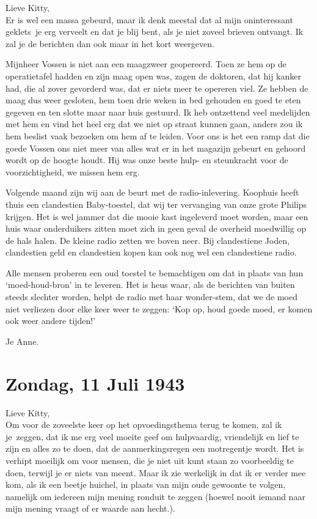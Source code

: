 \documentclass{book}
\begin{document}
Lieve Kitty,\\Er is wel een massa gebeurd, maar ik denk meestal dat al
mijn oninteressant geklets~je erg verveelt en dat je blij bent, als je
niet zoveel brieven ontvangt. Ik zal je de berichten dan ook maar in het
kort weergeven.

Mijnheer Vossen is niet aan een maagzweer geopereerd. Toen ze hem op de
operatietafel hadden en zijn maag open was, zagen de doktoren, dat hij
kanker had, die al zover gevorderd was, dat er niets meer te opereren
viel. Ze hebben de maag dus weer gesloten, hem toen drie weken in bed
gehouden en goed te eten gegeven en ten slotte maar naar huis gestuurd.
Ik heb ontzettend veel medelijden met hem en vind het heel erg dat we
niet op straat kunnen gaan, anders zou ik hem beslist vaak bezoeken om
hem af te leiden. Voor ons is het een ramp dat die goede Vossen ons niet
meer van alles wat er in het magazijn gebeurt en gehoord wordt op de
hoogte houdt. Hij was onze beste hulp- en steunkracht voor de
voorzichtigheid, we missen hem erg.

Volgende maand zijn wij aan de beurt met de radio-inlevering. Koophuis
heeft thuis een clandestien Baby-toestel, dat wij ter vervanging van
onze grote Philips krijgen. Het is wel jammer dat die mooie kast
ingeleverd moet worden, maar een huis waar onderduikers zitten moet zich
in geen geval de overheid moedwillig op de hals halen. De kleine radio
zetten we boven neer. Bij clandestiene Joden, clandestien geld en
clandestien kopen kan ook nog wel een clandestiene radio.

Alle mensen proberen een oud toestel te bemachtigen om dat in plaats van
hun `moed-houd-bron' in te leveren. Het is heus waar, als de berichten
van buiten steeds slechter worden, helpt de radio met haar wonder-stem,
dat we de moed niet verliezen door elke keer weer te zeggen: `Kop op,
houd goede moed, er komen ook weer andere tijden!'

Je Anne.

\chapter{Zondag, 11 Juli 1943}

Lieve Kitty,\\Om voor de zoveelste keer op het opvoedingsthema terug te
komen, zal ik je~zeggen, dat ik me erg veel moeite geef om hulpvaardig,
vriendelijk en lief te zijn en alles zo te doen, dat de aanmerkingsregen
een motregentje wordt. Het is verhipt moeilijk om voor mensen, die je
niet uit kunt staan zo voorbeeldig te doen, terwijl je er niets van
meent. Maar ik zie werkelijk in dat ik er verder mee kom, als ik een
beetje huichel, in plaats van mijn oude gewoonte te volgen, namelijk om
iedereen mijn mening ronduit te zeggen (hoewel nooit iemand naar mijn
mening vraagt of er waarde aan hecht.).
\end{document}
